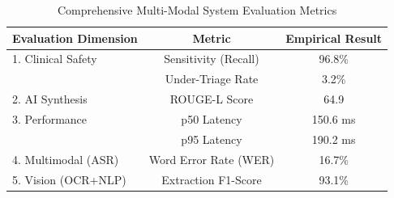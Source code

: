 \begin{table}[htbp]
\centering
\caption{Comprehensive Multi-Modal System Evaluation Metrics}
\label{tab:full_eval}
\begin{tabular}{|l|c|c|}
\hline
\textbf{Evaluation Dimension} & \textbf{Metric} & \textbf{Empirical Result} \\
\hline
1. Clinical Safety & Sensitivity (Recall) & 96.8\% \\
                   & Under-Triage Rate & 3.2\% \\
\hline
2. AI Synthesis    & ROUGE-L Score & 64.9 \\
\hline
3. Performance     & p50 Latency & 150.6 ms \\
                   & p95 Latency & 190.2 ms \\
\hline
4. Multimodal (ASR)& Word Error Rate (WER) & 16.7\% \\
\hline
5. Vision (OCR+NLP)& Extraction F1-Score & 93.1\% \\
\hline
\end{tabular}
\end{table}